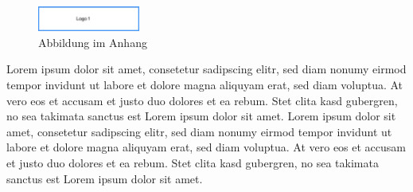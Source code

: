 \begin{figure}[htb]
    \centering
    \includegraphics[width=0.3\textwidth,angle=0]{abb/logo1}
    \caption[Abbildung im Anhang]{Abbildung im Anhang}
    \label{fig:Abbildung im Anhang}
\end{figure}

Lorem ipsum dolor sit amet, consetetur sadipscing elitr, sed diam nonumy eirmod tempor invidunt ut labore et dolore magna aliquyam erat, sed diam voluptua. At vero eos et accusam et justo duo dolores et ea rebum. Stet clita kasd gubergren, no sea takimata sanctus est Lorem ipsum dolor sit amet. Lorem ipsum dolor sit amet, consetetur sadipscing elitr, sed diam nonumy eirmod tempor invidunt ut labore et dolore magna aliquyam erat, sed diam voluptua. At vero eos et accusam et justo duo dolores et ea rebum. Stet clita kasd gubergren, no sea takimata sanctus est Lorem ipsum dolor sit amet.
